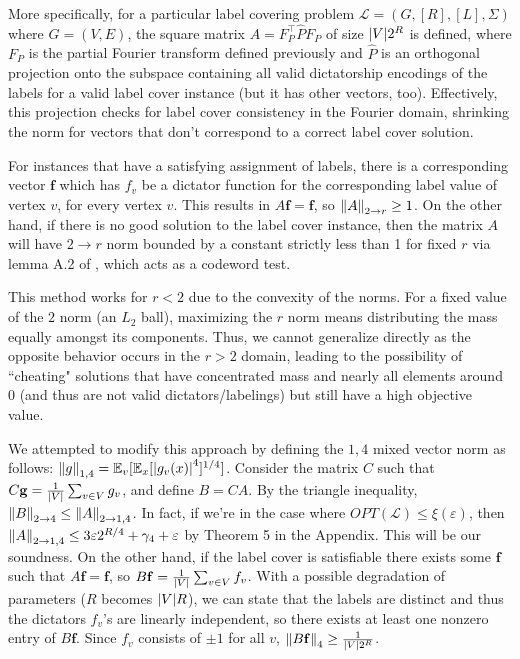 \documentclass[10pt]{article}
\newcommand{\E}{\mathbb{E}}
\newcommand{\mbf}[1]{\mathbf{ #1 }}
\begin{document}
More specifically, for a particular label covering problem $\mathcal{L} = (G, [R], [L], \Sigma)$ where $G = (V, E)$, the square matrix $A = F_P^\top \hat{P} F_P$ of size $\abs{V} 2^R$ is defined, where $F_P$ is the partial Fourier transform defined previously and $\hat{P}$ is an orthogonal projection onto the subspace containing all valid dictatorship encodings of the labels for a valid label cover instance (but it has other vectors, too). Effectively, this projection checks for label cover consistency in the Fourier domain, shrinking the norm for vectors that don't correspond to a correct label cover solution.

For instances that have a satisfying assignment of labels, there is a corresponding vector $\mathbf{f}$ which has $f_v$ be a dictator function for the corresponding label value of vertex $v$, for every vertex $v$. This results in $A\mathbf{f} = \mathbf{f}$, so $\norm{A}_{2 \to r} \geq 1$. On the other hand, if there is no good solution to the label cover instance, then the matrix $A$ will have $2 \to r$ norm bounded by a constant strictly less than 1 for fixed $r$ via lemma A.2 of \cite{pqalmost}, which acts as a codeword test.

This method works for $r < 2$ due to the convexity of the norms. For a fixed value of the $2$ norm (an $L_2$ ball), maximizing the $r$ norm means distributing the mass equally amongst its components. Thus, we cannot generalize directly as the opposite behavior occurs in the $r > 2$ domain, leading to the possibility of ``cheating" solutions that have concentrated mass and nearly all elements around $0$ (and thus are not valid dictators/labelings) but still have a high objective value.

We attempted to modify this approach by defining the $1,4$ mixed vector norm as follows: $\norm{g}_{1,4} = \E_v[\E_x[\abs{g_v(x)}^4]^{1/4}]$. Consider the matrix $C$ such that $C\mathbf{g} = \frac{1}{\abs{V}} \sum_{v \in V} 
g_v$, and define $B = CA$. By the triangle inequality, $\norm{B}_{2 \to 4} \leq \norm{A}_{2 \to 1,4}$. In fact, if we're in the case where $OPT(\mathcal{L}) \leq \xi(\varepsilon)$, then $\norm{A}_{2 \to 1, 4} \leq 3 \varepsilon 2^{R/4} + \gamma_4 + \varepsilon$ by Theorem 5 in the Appendix. This will be our soundness. On the other hand, if the label cover is satisfiable there exists some $\mathbf{f}$ such that $A\mathbf{f} = \mathbf{f}$, so $B \mathbf{f} = \frac{1}{\abs{V}} \sum_{v \in V} f_v$. With a possible degradation of parameters ($R$ becomes $\abs{V}R$), we can state that the labels are distinct and thus the dictators $f_v$'s are linearly independent, so there exists at least one nonzero entry of $B\mathbf{f}$. Since $f_v$ consists of $\pm 1$ for all $v$, $\norm{B\mbf{f}}_4\geq \frac{1}{\abs{V} 2^R}$. 
\end{document}

